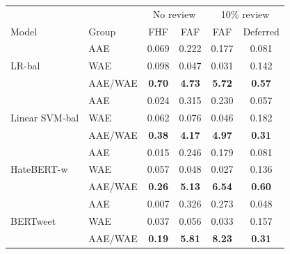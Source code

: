 \begin{tabular}{llcccc}
\toprule
 & & \multicolumn{2}{c}{No review} & \multicolumn{2}{c}{10\% review} \\
Model & Group & FHF & FAF & FAF & Deferred \\
\midrule
\multirow{3}{*}{LR-bal} & AAE & 0.069 & 0.222 & 0.177 & 0.081 \\
 & WAE & 0.098 & 0.047 & 0.031 & 0.142 \\
 & AAE/WAE & \textbf{0.70} & \textbf{4.73} & \textbf{5.72} & \textbf{0.57} \\ \midrule
\multirow{3}{*}{Linear SVM-bal} & AAE & 0.024 & 0.315 & 0.230 & 0.057 \\
 & WAE & 0.062 & 0.076 & 0.046 & 0.182 \\
 & AAE/WAE & \textbf{0.38} & \textbf{4.17} & \textbf{4.97} & \textbf{0.31} \\ \midrule
\multirow{3}{*}{HateBERT-w} & AAE & 0.015 & 0.246 & 0.179 & 0.081 \\
 & WAE & 0.057 & 0.048 & 0.027 & 0.136 \\
 & AAE/WAE & \textbf{0.26} & \textbf{5.13} & \textbf{6.54} & \textbf{0.60} \\ \midrule
\multirow{3}{*}{BERTweet} & AAE & 0.007 & 0.326 & 0.273 & 0.048 \\
 & WAE & 0.037 & 0.056 & 0.033 & 0.157 \\
 & AAE/WAE & \textbf{0.19} & \textbf{5.81} & \textbf{8.23} & \textbf{0.31} \\ \bottomrule
\end{tabular}
